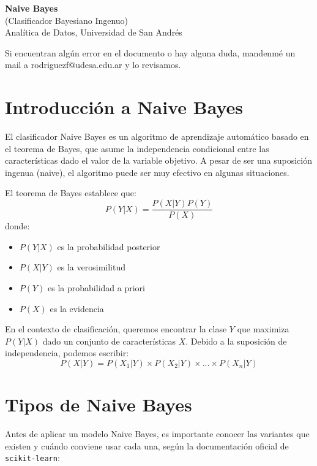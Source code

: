 \documentclass[12pt]{article}
\begin{document}
\begin{center}
  {\LARGE \textbf{Naive Bayes}}\\[0.5em]
  {\normalsize (Clasificador Bayesiano Ingenuo)}\\[0.5em]
  {Analítica de Datos, Universidad de San Andrés}
\end{center}

Si encuentran algún error en el documento o hay alguna duda, mandenmé un mail a rodriguezf@udesa.edu.ar y lo revisamos.

\section{Introducción a Naive Bayes}
El clasificador Naive Bayes es un algoritmo de aprendizaje automático basado en el teorema de Bayes, que asume la independencia condicional entre las características dado el valor de la variable objetivo. A pesar de ser una suposición ingenua (naive), el algoritmo puede ser muy efectivo en algunas situaciones.

\vspace{1em}

El teorema de Bayes establece que:
\[
P(Y|X) = \frac{P(X|Y)P(Y)}{P(X)}
\]
donde:
\begin{itemize}
    \item $P(Y|X)$ es la probabilidad posterior
    \item $P(X|Y)$ es la verosimilitud
    \item $P(Y)$ es la probabilidad a priori
    \item $P(X)$ es la evidencia
\end{itemize}

\vspace{1em}

En el contexto de clasificación, queremos encontrar la clase $Y$ que maximiza $P(Y|X)$ dado un conjunto de características $X$. Debido a la suposición de independencia, podemos escribir:
\[
P(X|Y) = P(X_1|Y) \times P(X_2|Y) \times ... \times P(X_n|Y)
\]

\section{Tipos de Naive Bayes}
Antes de aplicar un modelo Naive Bayes, es importante conocer las variantes que existen y cuándo conviene usar cada una, según la documentación oficial de \texttt{scikit-learn}:
\end{document}
